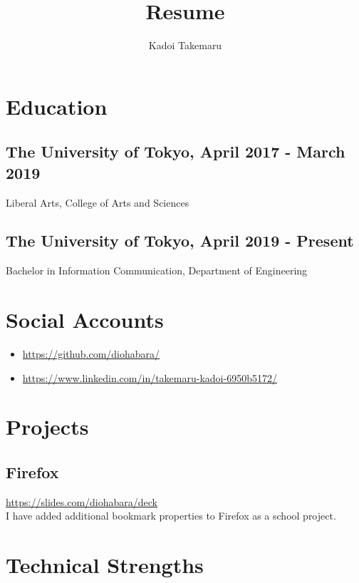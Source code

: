 \documentclass{article}
\title{Resume}
\author{Kadoi Takemaru}
\begin{document}
\maketitle

\section*{Education}
  \subsection*{The University of Tokyo, April 2017 - March 2019}
    Liberal Arts, College of Arts and Sciences
  \subsection*{The University of Tokyo, April 2019 - Present}
    Bachelor in Information Communication, Department of Engineering

\section*{Social Accounts}
  \begin{itemize}
    \item \url{https://github.com/diohabara/}
    \item \url{https://www.linkedin.com/in/takemaru-kadoi-6950b5172/}
  \end{itemize}
  

\section*{Projects}
  \subsection*{Firefox}
    \url{https://slides.com/diohabara/deck}
    \\ I have added additional bookmark properties to Firefox as a school project.


\section*{Technical Strengths}
\end{document}

